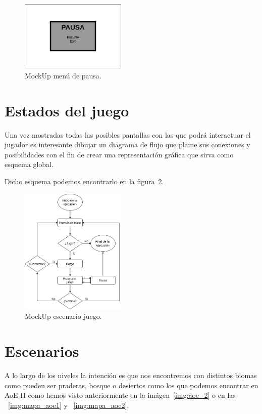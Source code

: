 \begin{figure}[ht]
\centering
\includegraphics[width=0.45\textwidth]{imagenes/gdd/pantallas/Pantalla_pausa.png}
\caption{MockUp menú de pausa.}
\label{mockup_pausa}
\end{figure}

\section{Estados del juego}

Una vez mostradas todas las posibles pantallas con las que podrá interactuar el jugador
es interesante dibujar un diagrama de flujo que plame sus conexiones y posibilidades
con el fin de crear una representación gráfica que sirva como esquema global.

Dicho esquema podemos encontrarlo en la figura~\ref{esq:flow_juego}.

\begin{figure}[ht]
\centering
\includegraphics[width=0.45\textwidth]{imagenes/gdd/pantallas/flow_ejecucion.png}
\caption{MockUp escenario juego.}
\label{esq:flow_juego}
\end{figure}

\section{Escenarios}
A lo largo de los niveles la intención es que nos encontremos con distintos biomas como
pueden ser praderas, bosque o desiertos como los que podemos encontrar en \ac{AoE} II
como hemos visto anteriormente en la imágen~\ref{img:aoe_2} o en las
~\ref{img:mapa_aoe1} y ~\ref{img:mapa_aoe2}.

